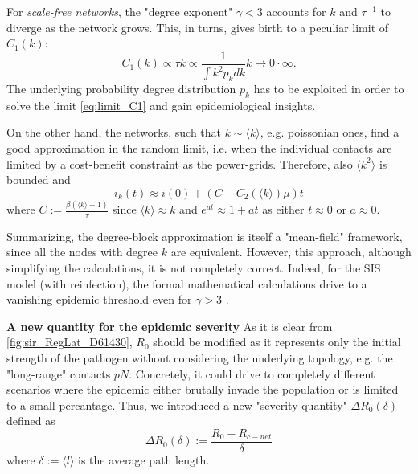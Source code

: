 \documentclass[a4paper,10pt,twoside]{book} %
\theoremstyle{definition}
\begin{document}
For \textit{scale-free networks}, the "degree exponent" $\gamma<3$ accounts for $k$ and $\tau^{-1}$ to diverge as the network grows. This, in turns, gives birth to a peculiar limit of $C_1(k)$: \vspace{3mm}
\begin{equation}
	C_1(k)\propto \tau k \propto \frac{1}{\int k^2 p_k dk}k  \to 0 \cdot \infty.
	\label{eq:limit_C1}
\end{equation}
The underlying probability degree distribution $p_k$ has to be exploited in order to solve the limit \autoref{eq:limit_C1} and gain epidemiological insights.

On the other hand, the networks, such that $k \sim \langle k \rangle$, e.g. poissonian ones, find a good approximation in the random limit, i.e. when the individual contacts are limited by a cost-benefit constraint as the power-grids. Therefore, also $\langle k^2 \rangle $ is bounded and
\begin{equation}
	i_k(t) \approx i(0)  + \left(C - C_2(\langle k \rangle )\mu \right) t
\end{equation}
where $C:= \frac{\beta (\langle k \rangle -1)}{\tau}$ since $\langle k \rangle \approx k$ and $e^{at}\approx1+at$ as either $t\approx0$ or $a \approx 0$.

Summarizing, the degree-block approximation is itself a "mean-field" framework, since all the nodes with degree $k$  are equivalent. However, this approach, although simplifying the calculations, it is not completely correct. Indeed, for the SIS model (with reinfection), the formal mathematical calculations drive to a vanishing epidemic threshold even for $\gamma>3$ \cite{barabasi::2016networkbook}.

\textbf{A new quantity for the epidemic severity} 
\label{sec:def_epidemic_severity}
As it is clear from \autoref{fig:sir_RegLat_D61430}, $R_0$ should be modified as it represents only the initial strength of the pathogen without considering the underlying topology, e.g. the "long-range" contacts $pN$. Concretely, it could drive to completely different scenarios where the epidemic either brutally invade the population or is limited to a small percantage. Thus, we introduced a new "severity quantity" $ \Delta R_0 (\delta)$ defined as
\begin{equation}
	\Delta R_0 (\delta):= \frac{R_0 - R_{c-net}}{\delta}
	\label{eq:def_DR0delta}
\end{equation}
where $\delta:=\langle l \rangle $ is the average path length.
\end{document}
